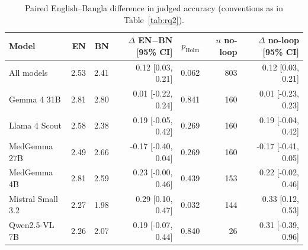 \begin{table}[!htbp]
\centering
\small
\begin{tabular}{lrrrrrr}
\toprule
Model & EN & BN & $\Delta$ EN$-$BN [95\% CI] & $p_{\mathrm{Holm}}$ & $n$ no-loop & $\Delta$ no-loop [95\% CI] \\
\midrule
All models & 2.53 & 2.41 & 0.12 [0.03, 0.21] & 0.062 & 803 & 0.12 [0.03, 0.21] \\
\midrule
Gemma 4 31B & 2.81 & 2.80 & 0.01 [-0.22, 0.24] & 0.841 & 160 & 0.01 [-0.23, 0.23] \\
Llama 4 Scout & 2.58 & 2.38 & 0.19 [-0.05, 0.42] & 0.269 & 160 & 0.19 [-0.04, 0.42] \\
MedGemma 27B & 2.49 & 2.66 & -0.17 [-0.40, 0.04] & 0.269 & 160 & -0.17 [-0.41, 0.05] \\
MedGemma 4B & 2.81 & 2.59 & 0.23 [-0.00, 0.46] & 0.439 & 153 & 0.22 [-0.02, 0.46] \\
Mistral Small 3.2 & 2.27 & 1.98 & 0.29 [0.10, 0.47] & 0.032 & 144 & 0.33 [0.12, 0.53] \\
Qwen2.5-VL 7B & 2.26 & 2.07 & 0.19 [-0.07, 0.44] & 0.840 & 26 & 0.31 [-0.39, 0.96] \\
\bottomrule
\end{tabular}
\caption{Paired English--Bangla difference in judged accuracy (conventions as in Table~\ref{tab:rq2}).}
\label{tab:rq2accuracy}
\end{table}
